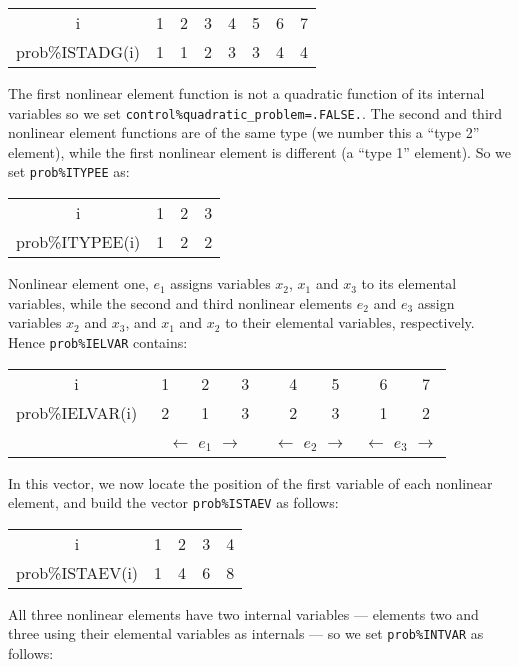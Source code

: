 \documentclass{galahad}
\begin{document}
\begin{center}
{\tt \begin{tabular}{cccccccc}
i         & 1 & 2 & 3 & 4 & 5 & 6 & 7\\
prob\%ISTADG(i) & 1 & 1 & 2 & 3 & 3 & 4 & 4
\end{tabular} }
\end{center}
The first nonlinear element function is not a quadratic function
of its internal variables so we set {\tt control\%quadratic\-\_problem=.FALSE.}.
The second and third nonlinear element functions are of the
same type (we number this a ``type 2'' element), while
the first nonlinear element is different (a ``type 1'' element).
So we set {\tt prob\%ITYPEE} as:

\begin{center}
{\tt \begin{tabular}{cccc}
i        & 1 & 2 & 3 \\
prob\%ITYPEE(i) & 1 & 2 & 2
\end{tabular}}
\end{center}
Nonlinear element one, $e_1$ assigns variables $x_2$, $x_1$ and
$x_3$ to its elemental variables, while
the second and third nonlinear elements $e_2$ and $e_3$
assign variables $x_2$ and
$x_3$, and $x_1$ and $x_2$ to their elemental variables, respectively.
Hence {\tt prob\%IELVAR} contains:

\begin{center}
{\tt \begin{tabular}{clcrlrlr}
i         & ~1 & ~~2 & ~~3~ & ~~4 & 5~ & ~~6 & 7~ \\
prob\%IELVAR(i) & ~2 & ~~1 & ~~3~ & ~~2 & 3~ & ~~1 & 2~ \\
&
\multicolumn{3}{c}{$\longleftarrow$ {$e_1$} $\longrightarrow$} &
\multicolumn{2}{c}{$\leftarrow$ {$e_2$} $\rightarrow$} &
\multicolumn{2}{c}{$\leftarrow$ {$e_3$} $\rightarrow$}
\end{tabular} }
\end{center}
In this vector, we now locate the position of the first
variable of each nonlinear element, and build the vector {\tt prob\%ISTAEV} as
follows:

\begin{center}
{\tt \begin{tabular}{ccccc}
i         & 1 & 2 & 3 & 4\\
prob\%ISTAEV(i) & 1 & 4 & 6 & 8
\end{tabular} }
\end{center}
All three nonlinear elements have two internal variables --- elements
two and three using their elemental variables as internals --- so we set
{\tt prob\%INTVAR} as follows:
\end{document}
